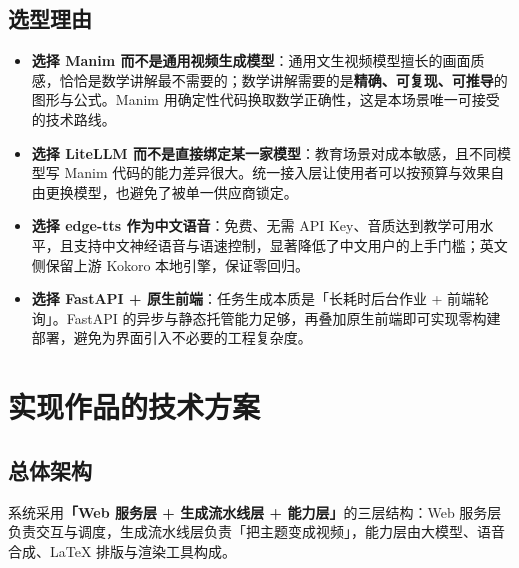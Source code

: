 \documentclass[11pt,a4paper]{ctexart}
\begin{document}
\subsection{选型理由}

\begin{itemize}
  \item \textbf{选择 Manim 而不是通用视频生成模型}：通用文生视频模型擅长的画面质感，恰恰是数学讲解最不需要的；数学讲解需要的是\textbf{精确、可复现、可推导}的图形与公式。Manim 用确定性代码换取数学正确性，这是本场景唯一可接受的技术路线。
  \item \textbf{选择 LiteLLM 而不是直接绑定某一家模型}：教育场景对成本敏感，且不同模型写 Manim 代码的能力差异很大。统一接入层让使用者可以按预算与效果自由更换模型，也避免了被单一供应商锁定。
  \item \textbf{选择 edge-tts 作为中文语音}：免费、无需 API Key、音质达到教学可用水平，且支持中文神经语音与语速控制，显著降低了中文用户的上手门槛；英文侧保留上游 Kokoro 本地引擎，保证零回归。
  \item \textbf{选择 FastAPI + 原生前端}：任务生成本质是「长耗时后台作业 + 前端轮询」。FastAPI 的异步与静态托管能力足够，再叠加原生前端即可实现零构建部署，避免为界面引入不必要的工程复杂度。
\end{itemize}

\section{实现作品的技术方案}

\subsection{总体架构}

系统采用\textbf{「Web 服务层 + 生成流水线层 + 能力层」}的三层结构：Web 服务层负责交互与调度，生成流水线层负责「把主题变成视频」，能力层由大模型、语音合成、LaTeX 排版与渲染工具构成。
\end{document}
